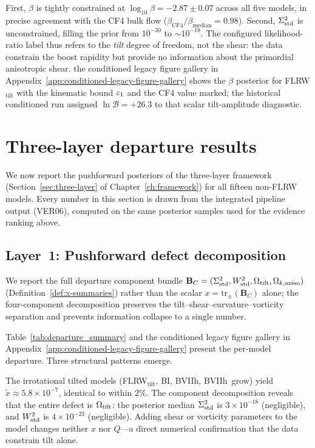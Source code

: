 First, $\beta$ is tightly constrained at
$\log_{10}\beta = -2.87 \pm 0.07$ across all five models, in
precise agreement with the CF4 bulk flow
($\beta_{\mathrm{CF4}}/\beta_{\mathrm{median}} = 0.98$).
Second, $\Sigma^2_{\mathrm{std}}$ is unconstrained, filling the prior from
$10^{-30}$ to $\sim 10^{-18}$.  The configured likelihood-ratio
label thus refers to the \emph{tilt} degree of freedom, not the shear: the data constrain
the boost rapidity but provide no information about the
primordial anisotropic shear.
the conditioned legacy figure gallery in Appendix~\ref{app:conditioned-legacy-figure-gallery} shows the $\beta$ posterior
for FLRW$_{\mathrm{tilt}}$ with the kinematic bound $\varepsilon_1$
and the CF4 value marked; the historical conditioned run assigned
$\ln\mathcal{B} = +26.3$ to that scalar tilt-amplitude diagnostic.


\section{Three-layer departure results}
\label{sec:departure-results}

We now report the pushforward posteriors of the three-layer
framework (Section~\ref{sec:three-layer} of
Chapter~\ref{ch:framework}) for all fifteen non-FLRW models.
Every number in this section is drawn from the integrated
pipeline output (VER06), computed on the same posterior
samples used for the evidence ranking above.


\subsection{Layer~1: Pushforward defect decomposition}
\label{sec:layer1-results}

We report the full departure component bundle
$\mathbf{B}_C = (\Sigma^2_{\mathrm{std}}, W^2_{\mathrm{std}}, \Omega_{\mathrm{tilt}}, \Omega_{k,\mathrm{aniso}})$
(Definition~\ref{def:x-summaries}) rather than the scalar
$x = \mathrm{tr}_{\pm}(\mathbf{B}_C)$ alone; the four-component
decomposition preserves the tilt--shear--curvature--vorticity
separation and prevents information collapse to a single number.

Table~\ref{tab:departure_summary} and
the conditioned legacy figure gallery in Appendix~\ref{app:conditioned-legacy-figure-gallery} present the per-model
departure.  Three structural patterns emerge.

The irrotational tilted models (FLRW$_{\mathrm{tilt}}$, BI,
BVIIh, BVIIh~grow) yield $\tilde{x} \approx 5.8 \times
10^{-7}$, identical to within $2\%$.  The component
decomposition reveals that the entire defect is
$\Omega_{\mathrm{tilt}}$: the posterior median $\Sigma^2_{\mathrm{std}}$ is $3 \times
10^{-18}$ (negligible), and $W^2_{\mathrm{std}}$ is $4 \times 10^{-23}$
(negligible).  Adding shear or vorticity parameters to the
model changes neither $x$ nor $Q$---a direct numerical
confirmation that the data constrain tilt alone.

